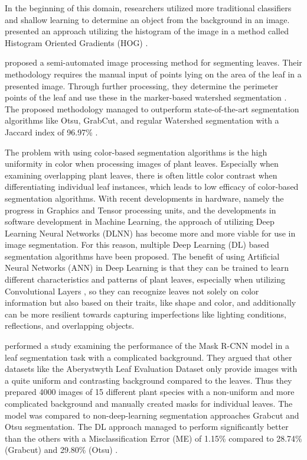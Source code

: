 \documentclass[draft,final]{vutinfth} %
\begin{document}
In the beginning of this domain, researchers utilized more traditional classifiers and shallow learning to determine an object from the background in an image. \citeauthor{lowe_distinctive_2004} presented an approach utilizing the histogram of the image in a method called Histogram Oriented Gradients (HOG) \cite{lowe_distinctive_2004}. 

\citeauthor{gao_method_2018} proposed a semi-automated image processing method for segmenting leaves. Their methodology requires the manual input of points lying on the area of the leaf in a presented image. Through further processing, they determine the perimeter points of the leaf and use these in the marker-based watershed segmentation \cite{kornilov_review_2022}. The proposed methodology managed to outperform state-of-the-art segmentation algorithms like Otsu, GrabCut, and regular Watershed segmentation with a Jaccard index of 96.97\% \cite{gao_method_2018}.

The problem with using color-based segmentation algorithms is the high uniformity in color when processing images of plant leaves. Especially when examining overlapping plant leaves, there is often little color contrast when differentiating individual leaf instances, which leads to low efficacy of color-based segmentation algorithms.
With recent developments in hardware, namely the progress in Graphics and Tensor processing units, and the developments in software development in Machine Learning, the approach of utilizing Deep Learning Neural Networks (DLNN) has become more and more viable for use in image segmentation. For this reason, multiple Deep Learning (DL) based segmentation algorithms have been proposed. The benefit of using Artificial Neural Networks (ANN) in Deep Learning is that they can be trained to learn different characteristics and patterns of plant leaves, especially when utilizing Convolutional Layers \cite{patil_convolutional_2021}, so they can recognize leaves not solely on color information but also based on their traits, like shape and color, and additionally can be more resilient towards capturing imperfections like lighting conditions, reflections, and overlapping objects. 

\citeauthor{yang_leaf_2020} performed a study examining the performance of the Mask R-CNN model in a leaf segmentation task with a complicated background. They argued that other datasets like the Aberystwyth Leaf Evaluation Dataset \cite{bell_aberystwyth_2016, scharr_leaf_2016, minervini_finely-grained_2016} only provide images with a quite uniform and contrasting background compared to the leaves. Thus they prepared 4000 images of 15 different plant species with a non-uniform and more complicated background and manually created masks for individual leaves. The model was compared to non-deep-learning segmentation approaches Grabcut and Otsu segmentation. The DL approach managed to perform significantly better than the others with a Misclassification Error (ME) of 1.15\% compared to 28.74\% (Grabcut) and 29.80\% (Otsu) \cite{yang_leaf_2020}.
\end{document}
